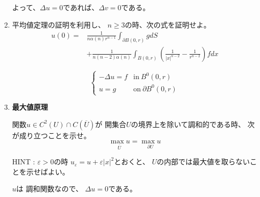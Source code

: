 \documentclass[12pt,b5paper]{ltjsarticle}
\begin{document}
\begin{enumerate}
      よって、$\Delta u=0$であれば、$\Delta v =0$である。

      \hrulefill


 \item

      平均値定理の証明を利用し、
      $n\geq 3$の時、次の式を証明せよ。
      \begin{equation}
       \begin{split}
       u(0) =& \frac{1}{n\alpha(n)r^{n-1}} \int_{\partial B(0,r)} g dS\\
         &+ \frac{1}{n(n-2)\alpha(n)} \int_{B(0,r)}
         \left( \frac{1}{\lvert x \rvert^{n-2}}
          -  \frac{1}{r^{n-2}}\right)  f dx
       \end{split}
      \end{equation}

      \begin{equation}
       \begin{cases}
        -\Delta u =f & \text{in}\: B^{0}(0,r)\\
        u=g & \text{on}\: \partial B^{0}(0,r)
       \end{cases}
      \end{equation}

      \dotfill



      \hrulefill

 \item
      \textbf{最大値原理}

      関数$u \in C^{2}(U) \cap C(\overline{U})$が
      開集合$U$の境界上を除いて調和的である時、
      次が成り立つことを示せ。
      \begin{equation}
       \underset{\overline{U}}{\max {u}}
        = \underset{\partial{U}}{\max {u}}
      \end{equation}

      HINT :
      $\varepsilon >0$の時
      $u_{\varepsilon}=u+\varepsilon \lvert x \rvert^{2}$とおくと、
      $U$の内部では最大値を取らないことを示せばよい。

      \dotfill

      $u$は
      調和関数なので、
      $\Delta u =0$である。



\end{enumerate}
\end{document}
